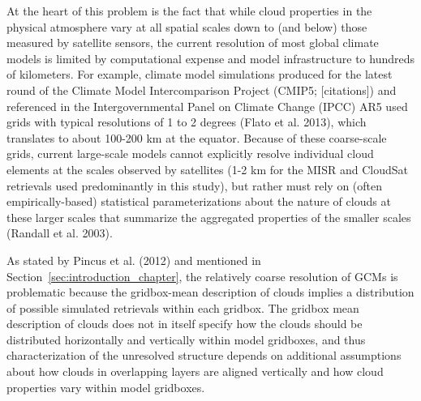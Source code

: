 At the heart of this problem is the fact that while cloud properties in
the physical atmosphere vary at all spatial scales down to (and below)
those measured by satellite sensors, the current resolution of most
global climate models is limited by computational expense and model
infrastructure to hundreds of kilometers. For example, climate model
simulations produced for the latest round of the Climate Model
Intercomparison Project (CMIP5; {[}citations{]}) and referenced in the
Intergovernmental Panel on Climate Change (IPCC) AR5 used grids with
typical resolutions of 1 to 2 degrees (Flato et al. 2013), which
translates to about 100-200 km at the equator. Because of these
coarse-scale grids, current large-scale models cannot explicitly resolve
individual cloud elements at the scales observed by satellites (1-2 km
for the MISR and CloudSat retrievals used predominantly in this study),
but rather must rely on (often empirically-based) statistical
parameterizations about the nature of clouds at these larger scales that
summarize the aggregated properties of the smaller scales (Randall et
al. 2003).

As stated by Pincus et al. (2012) and mentioned in
Section~\ref{sec:introduction_chapter}, the relatively coarse resolution
of GCMs is problematic because the gridbox-mean description of clouds
implies a distribution of possible simulated retrievals within each
gridbox. The gridbox mean description of clouds does not in itself
specify how the clouds should be distributed horizontally and vertically
within model gridboxes, and thus characterization of the unresolved
structure depends on additional assumptions about how clouds in
overlapping layers are aligned vertically and how cloud properties vary
within model gridboxes.

